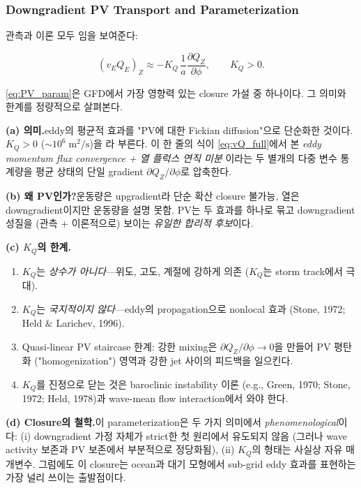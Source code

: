 \subsubsection{Downgradient PV Transport and Parameterization}

관측과 이론 모두 임을 보여준다:

\begin{equation}\label{eq:PV_param}
  (v_E Q_E)_Z \approx -K_Q\,\frac{1}{a}\frac{\partial Q_Z}{\partial\phi},
  \qquad K_Q > 0.
\end{equation}

\begin{example}\label{ex:ch04_hw6_PVdiff}
\eqref{eq:PV_param}은 GFD에서 가장 영향력 있는 closure 가설 중 하나이다.
그 의미와 한계를 정량적으로 살펴본다.

\smallskip
\textbf{(a) 의미.}\quad eddy의 평균적 효과를 "PV에 대한 Fickian
diffusion"으로 단순화한 것이다.  $K_Q > 0$ ($\sim 10^6\;\text{m}^2/\text{s}$)을
라 부른다.  이 한 줄의 식이
\eqref{eq:vQ_full}에서 본 \emph{eddy momentum flux convergence + 열 플럭스 연직 미분}
이라는 두 별개의 다중 변수 통계량을 평균 상태의 단일 gradient
$\partial Q_Z/\partial\phi$로 압축한다.

\smallskip
\textbf{(b) 왜 PV인가?}\quad 운동량은 upgradient라 단순 확산 closure 불가능,
열은 downgradient이지만 운동량을 설명 못함.  PV는 두 효과를
하나로 묶고 downgradient 성질을 (관측 + 이론적으로) 보이는
\textit{유일한 합리적 후보}이다.

\smallskip
\textbf{(c) $K_Q$의 한계.}\quad
\begin{enumerate}
  \item $K_Q$는 \textit{상수가 아니다}---위도, 고도, 계절에 강하게 의존
        ($K_Q$는 storm track에서 극대).
  \item $K_Q$는 \textit{국지적이지 않다}---eddy의 propagation으로
        nonlocal 효과 (Stone, 1972; Held \& Larichev, 1996).
  \item Quasi-linear PV staircase 한계: 강한 mixing은 $\partial Q_Z/\partial\phi \to 0$을
        만들어 PV 평탄화 ("homogenization") 영역과 강한 jet 사이의
        피드백을 일으킨다.
  \item $K_Q$를 진정으로 닫는 것은 baroclinic instability 이론
        (e.g., Green, 1970; Stone, 1972; Held, 1978)과 wave-mean flow
        interaction에서 와야 한다.
\end{enumerate}

\smallskip
\textbf{(d) Closure의 철학.}\quad 이 parameterization은 두 가지 의미에서
\emph{phenomenological}이다: (i) downgradient 가정 자체가 strict한 첫 원리에서
유도되지 않음 (그러나 wave activity 보존과 PV 보존에서 부분적으로
정당화됨), (ii) $K_Q$의 형태는 사실상 자유 매개변수.  그럼에도 이 closure는
ocean과 대기 모형에서 sub-grid eddy 효과를 표현하는 가장 널리 쓰이는
출발점이다.
\end{example}

